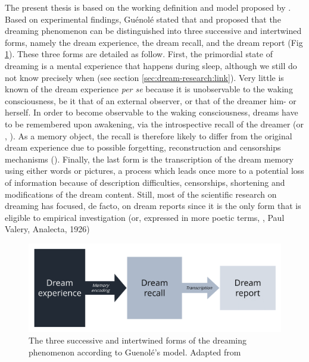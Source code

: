 The present thesis is based on the working definition and model proposed by \citet{guenole_a_2009}. Based on experimental findings, Guénolé stated that  and proposed that the dreaming phenomenon can be distinguished into three successive and intertwined forms, namely the dream experience, the dream recall, and the dream report (Fig \ref{fig:intro:guenole}). These three forms are detailed as follow. First, the primordial state of dreaming is a mental experience that happens during sleep, although we still do not know precisely when (see section \ref{sec:dream-research:link}). Very little is known of the dream experience \emph{per se} because it is unobservable to the waking consciousness, be it that of an external observer, or that of the dreamer him- or herself. In order to become observable to the waking consciousness, dreams have to be remembered upon awakening, via the introspective recall of the dreamer (or , \citealp{schwartz_dreaming:_2005}). As a memory object, the recall is therefore likely to differ from the original dream experience due to possible forgetting, reconstruction and censorships mechanisms (\cite{schwartz_sleep_2002, schwartz_dreaming:_2005}). Finally, the last form is the transcription of the dream memory using either words or pictures, a process which leads once more to a potential loss of information because of description difficulties, censorships, shortening and modifications of the dream content. Still, most of the scientific research on dreaming has focused, de facto, on dream reports since it is the only form that is eligible to empirical investigation (or, expressed in more poetic terms, , Paul Valery, Analecta, 1926)

\begin{figure}[htb]
	\includegraphics[width=\textwidth]{Fig/Intro/Intro_Guenole/Intro_Guenole.png}
	\caption[Guénolé's model of dreaming]{The three successive and intertwined forms of the dreaming phenomenon according to Guenolé's model. Adapted from \citet{guenole_a_2009}}
	\label{fig:intro:guenole}
\end{figure}


